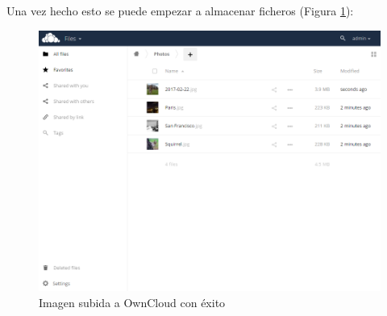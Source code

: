 Una vez hecho esto se puede empezar a almacenar ficheros (Figura \ref{fig:owncloud-uploaded-file}):

\begin{figure}[H]
	\centering
	\includegraphics[width=14cm]{img/owncloud-uploaded-file}
	\caption{Imagen subida a OwnCloud con éxito}
	\label{fig:owncloud-uploaded-file}
\end{figure}


\newpage


